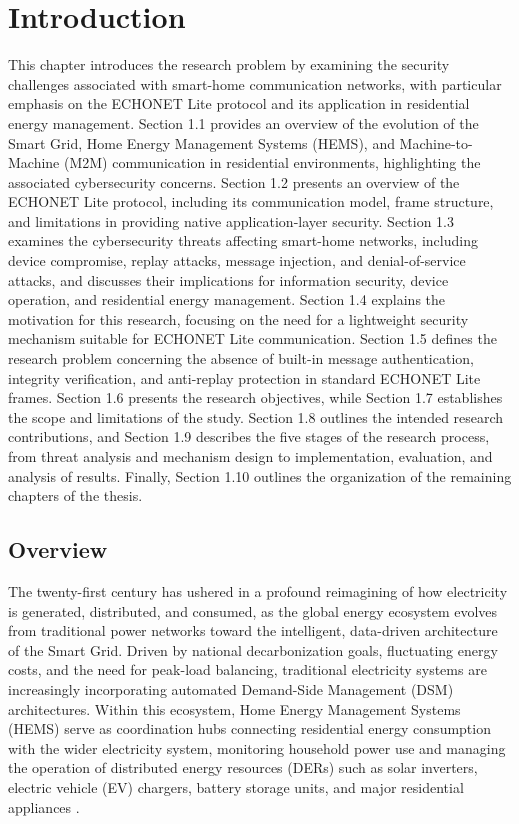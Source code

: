 \chapter{Introduction}\label{chap:intro}

This chapter introduces the research problem by examining the security challenges associated with smart-home communication networks, with particular emphasis on the ECHONET Lite protocol and its application in residential energy management. Section 1.1 provides an overview of the evolution of the Smart Grid, Home Energy Management Systems (HEMS), and Machine-to-Machine (M2M) communication in residential environments, highlighting the associated cybersecurity concerns. Section 1.2 presents an overview of the ECHONET Lite protocol, including its communication model, frame structure, and limitations in providing native application-layer security. Section 1.3 examines the cybersecurity threats affecting smart-home networks, including device compromise, replay attacks, message injection, and denial-of-service attacks, and discusses their implications for information security, device operation, and residential energy management. Section 1.4 explains the motivation for this research, focusing on the need for a lightweight security mechanism suitable for ECHONET Lite communication. Section 1.5 defines the research problem concerning the absence of built-in message authentication, integrity verification, and anti-replay protection in standard ECHONET Lite frames. Section 1.6 presents the research objectives, while Section 1.7 establishes the scope and limitations of the study. Section 1.8 outlines the intended research contributions, and Section 1.9 describes the five stages of the research process, from threat analysis and mechanism design to implementation, evaluation, and analysis of results. Finally, Section 1.10 outlines the organization of the remaining chapters of the thesis.


\section{Overview}

The twenty-first century has ushered in a profound reimagining of how electricity is generated, distributed, and consumed, as the global energy ecosystem evolves from traditional power networks toward the intelligent, data-driven architecture of the Smart Grid. Driven by national decarbonization goals, fluctuating energy costs, and the need for peak-load balancing, traditional electricity systems are increasingly incorporating automated Demand-Side Management (DSM) architectures. Within this ecosystem, Home Energy Management Systems (HEMS) serve as coordination hubs connecting residential energy consumption with the wider electricity system, monitoring household power use and managing the operation of distributed energy resources (DERs) such as solar inverters, electric vehicle (EV) chargers, battery storage units, and major residential appliances \citep{zafarHomeEnergyManagement2020,hanHomeEnergyManagement2023,isshikiCaseStudyEcological2015}.

